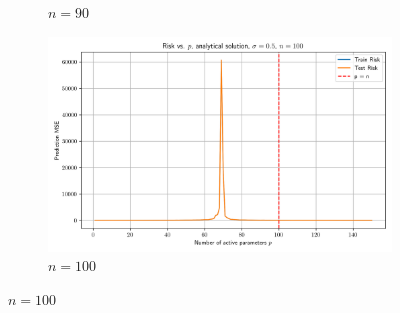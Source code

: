 \documentclass[twoside,10pt]{article}
\begin{document}
\begin{figure}[htb]
\begin{subfigure}[b]{\imgwidth}
    \caption{$n=90$}\label{fig:2g}
  \end{subfigure}%
  \hfill
  \begin{subfigure}[b]{\imgwidth}
    \includegraphics[width=\linewidth]{img2/risk_curve_n100.png}
    \caption{$n=100$}\label{fig:2h}
  \end{subfigure}

  \medskip


\end{figure}
\end{document}
